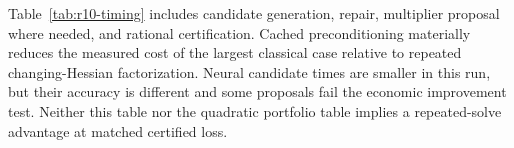 Table~\ref{tab:r10-timing} includes candidate generation, repair, multiplier proposal where needed, and rational certification. Cached preconditioning materially reduces the measured cost of the largest classical case relative to repeated changing-Hessian factorization. Neural candidate times are smaller in this run, but their accuracy is different and some proposals fail the economic improvement test. Neither this table nor the quadratic portfolio table implies a repeated-solve advantage at matched certified loss.


